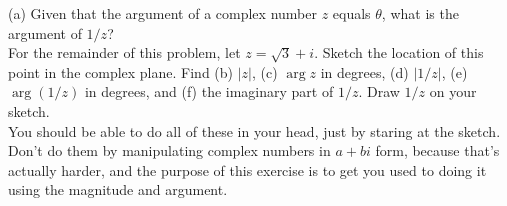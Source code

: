(a) Given that the argument of a complex number $z$ equals $\theta$,
what is the argument of $1/z$?\\
For the remainder of this problem, let
$z=\sqrt{3}+i$. Sketch the location of this point in the
complex plane. Find (b) $|z|$, (c) $\operatorname{arg} z$ in degrees,
(d) $|1/z|$, (e) $\operatorname{arg}(1/z)$ in degrees,
and (f) the imaginary part of $1/z$. Draw $1/z$ on your
sketch.\\
You should be able to
do all of these in your head, just by staring at the sketch.
Don't do them by manipulating complex numbers in $a+bi$ form,
because that's actually harder, and the purpose of this
exercise is to get you used to doing it using the magnitude
and argument.\answercheck
